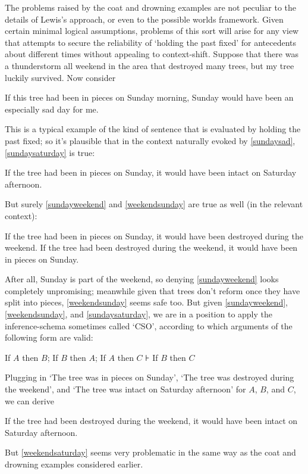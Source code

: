 \documentclass[If.tex]{subfiles}
\begin{document}
The problems raised by the coat and drowning examples are not peculiar to the details of Lewis's approach, or even to the possible worlds framework. Given certain minimal logical assumptions, problems of this sort will arise for any view that attempts to secure the reliability of ‘holding the past fixed’ for antecedents about different times without appealing to context-shift. Suppose that there was a thunderstorm all weekend in the area that destroyed many trees, but my tree luckily survived. Now consider
\begin{prop}
	\nitem \label{sundaysad}
		If this tree had been in pieces on Sunday morning, Sunday would have been an especially sad day for me.
\end{prop}
This is a typical example of the kind of sentence that is evaluated by holding the past fixed; so it's plausible that in the context naturally evoked by \ref{sundaysad}, \ref{sundaysaturday} is true:
\begin{prop}
	\nitem \label{sundaysaturday}
		If the tree had been in pieces on Sunday, it would have been intact on Saturday afternoon.
\end{prop}
But surely \ref{sundayweekend} and \ref{weekendsunday} are true as well (in the relevant context):
\begin{prop}
	\nitem \label{sundayweekend}
		If the tree had been in pieces on Sunday, it would have been destroyed during the weekend.
	\nitem \label{weekendsunday}
		If the tree had been destroyed during the weekend, it would have been in pieces on Sunday.
\end{prop}
After all, Sunday is part of the weekend, so denying \ref{sundayweekend} looks completely unpromising; meanwhile given that trees don't reform once they have split into pieces, \ref{weekendsunday} seems safe too. But given \ref{sundayweekend}, \ref{weekendsunday}, and \ref{sundaysaturday}, we are in a position to apply the inference-schema sometimes called ‘CSO’, according to which arguments of the following form are valid:
\begin{prop}
	\sitem[CSO]
	If $A$ then $B$; If $B$ then $A$; If $A$ then $C$ ⊦ If $B$ then $C$
\end{prop}
Plugging in ‘The tree was in pieces on Sunday’, ‘The tree was destroyed during the weekend’, and ‘The tree was intact on Saturday afternoon’ for $A$, $B$, and $C$, we can derive
\begin{prop}
	\nitem \label{weekendsaturday}
		If the tree had been destroyed during the weekend, it would have been intact on Saturday afternoon.
\end{prop}
But \ref{weekendsaturday} seems very problematic in the same way as the coat and drowning examples considered earlier.
\end{document}
